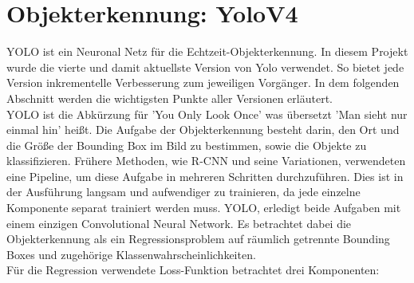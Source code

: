 \documentclass[conference]{IEEEtran}
\begin{document}
	\section{Objekterkennung: YoloV4}
	YOLO ist ein Neuronal Netz für die Echtzeit-Objekterkennung. In diesem Projekt wurde die vierte und damit aktuellste Version von Yolo\cite{b2} verwendet. So bietet jede Version inkrementelle Verbesserung zum jeweiligen Vorgänger. In dem folgenden Abschnitt werden die wichtigsten Punkte aller Versionen erläutert.\\
	YOLO ist die Abkürzung für 'You Only Look Once' was übersetzt 'Man sieht nur einmal hin' heißt. Die Aufgabe der Objekterkennung besteht darin, den Ort und die Größe der Bounding Box im Bild zu bestimmen, sowie die Objekte zu klassifizieren. Frühere Methoden, wie R-CNN und seine Variationen, verwendeten eine Pipeline, um diese Aufgabe in mehreren Schritten durchzuführen. Dies ist in der Ausführung langsam und aufwendiger zu trainieren, da jede einzelne Komponente separat trainiert werden muss. YOLO, erledigt beide Aufgaben mit einem einzigen Convolutional Neural Network. Es betrachtet dabei die Objekterkennung als ein Regressionsproblem auf räumlich getrennte Bounding Boxes und zugehörige Klassenwahrscheinlichkeiten.\\
	Für die Regression verwendete Loss-Funktion betrachtet drei Komponenten:
\end{document}
